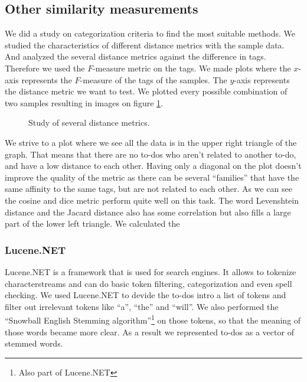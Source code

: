 \documentclass[a4paper,titlepage]{article}
\begin{document}
\subsection{Other similarity measurements}
We did a study on categorization criteria to find the most suitable methods. We studied the characteristics of different distance metrics with the sample data. And analyzed the several distance metrics against the difference in tags. Therefore we used the $F$-measure metric on the tags. We made plots where the $x$-axis represents the $F$-measure of the tags of the samples. The $y$-axis represents the distance metric we want to test. We plotted every possible combination of two samples resulting in images on figure \ref{fig:metricStudy}.
\begin{figure}
\centering
{}
\caption{Study of several distance metrics.}
\label{fig:metricStudy}
\end{figure}
We strive to a plot where we see all the data is in the upper right triangle of the graph. That means that there are no to-dos who aren't related to another to-do, and have a low distance to each other. Having only a diagonal on the plot doesn't improve the quality of the metric as there can be several ``families'' that have the same affinity to the same tags, but are not related to each other. As we can see the cosine and dice metric perform quite well on this task. The word Levenshtein distance and the Jacard distance also has some correlation but also fills a large part of the lower left triangle. We calculated the 
\subsubsection{Lucene.NET}
Lucene.NET is a framework that is used for search engines. It allows to tokenize characterstreams and can do basic token filtering, categorization and even spell checking. We used Lucene.NET to devide the to-dos intro a list of tokens and filter out irrelevant tokens like ``a'', ``the'' and ``will''. We also performed the ``Snowball English Stemming algorithm''\footnote{Also part of Lucene.NET} on those tokens, so that the meaning of those words became more clear. As a result we represented to-dos as a vector of stemmed words.
\end{document}
